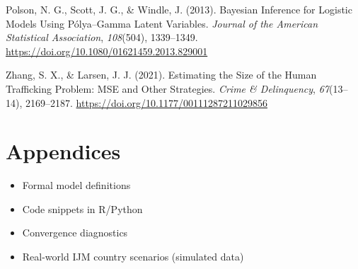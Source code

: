 \documentclass[
  12pt,
]{article}
\providecommand{\tightlist}{%
  \setlength{\itemsep}{0pt}\setlength{\parskip}{0pt}}\usepackage{longtable,booktabs,array}
\newlength{\cslhangindent}
\newenvironment{CSLReferences}[2] %
 {\begin{list}{}{%
  \setlength{\itemindent}{0pt}
  \setlength{\leftmargin}{0pt}
  \setlength{\parsep}{0pt}
  \ifodd #1
   \setlength{\leftmargin}{\cslhangindent}
   \setlength{\itemindent}{-1\cslhangindent}
  \fi
  \setlength{\itemsep}{#2\baselineskip}}}
 {\end{list}}
\theoremstyle{plain}
\theoremstyle{definition}
\begin{document}
\begin{CSLReferences}{1}{0}
Polson, N. G., Scott, J. G., \& Windle, J. (2013). Bayesian {Inference}
for {Logistic Models Using Pólya}--{Gamma Latent Variables}.
\emph{Journal of the American Statistical Association}, \emph{108}(504),
1339--1349. \url{https://doi.org/10.1080/01621459.2013.829001}

Zhang, S. X., \& Larsen, J. J. (2021). Estimating the {Size} of the
{Human Trafficking Problem}: {MSE} and {Other Strategies}. \emph{Crime
\& Delinquency}, \emph{67}(13--14), 2169--2187.
\url{https://doi.org/10.1177/00111287211029856}

\end{CSLReferences}

\newpage

\section*{Appendices}\label{appendices}

\begin{itemize}
\tightlist
\item
  Formal model definitions\\
\item
  Code snippets in R/Python\\
\item
  Convergence diagnostics\\
\item
  Real-world IJM country scenarios (simulated data)
\end{itemize}
\end{document}
